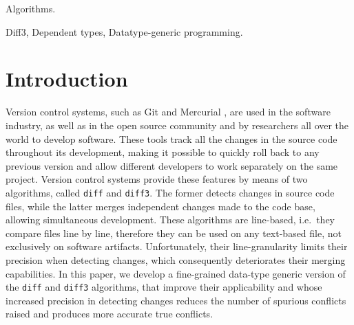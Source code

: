 \documentclass{sigplanconf}
\theoremstyle{plain}
\begin{document}

\terms
Algorithms.\

\keywords
Diff3, Dependent types, Datatype-generic programming.

\section{Introduction}
\label{sec:intro}
Version control systems, such as Git \cite{Git} and Mercurial
\cite{Mercurial}, are used in the software industry, as well as in the
open source community and by researchers all over the world to develop
software.
%
These tools track all the changes in the source code throughout its
development, making it possible to quickly roll back to any previous
version and allow different developers to work separately on the same
project.
%
Version control systems provide these features by means of two
algorithms, called \texttt{diff} and \texttt{diff3}.
%
The former detects changes in source code files, while the latter
merges independent changes made to the code base, allowing
simultaneous development.
%
These algorithms are line-based, i.e.\ they compare files line by
line, therefore they can be used on any text-based file, not
exclusively on software artifacts.
%
Unfortunately, their line-granularity limits their precision when
detecting changes, which consequently deteriorates their merging
capabilities.
%
In this paper, we develop a fine-grained data-type generic version of
the \texttt{diff} and \texttt{diff3} algorithms, that improve their
applicability and whose increased precision in detecting changes
reduces the number of spurious conflicts raised and produces more
accurate true conflicts.
\end{document}

